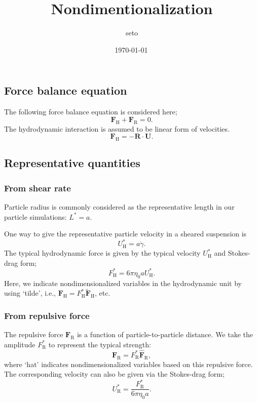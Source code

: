 \documentclass[fontsize=11pt]{scrartcl}
\title{Nondimentionalization}
\date{\shortdate\today \, \ampmtime }
\author{seto}
\begin{document}
\maketitle

\subsection*{Force balance equation}

The following force balance equation is considered here;
\begin{equation}
 \bm{F}_{\mathrm{H}} +  \bm{F}_{\mathrm{R}}  = 0.
\end{equation}
%
The hydrodynamic interaction is
assumed to be linear form of velocities.
%
\begin{equation}
 \bm{F}_{\mathrm{H}} = - \bm{R}\cdot\bm{U}.
\end{equation}

\subsection*{Representative quantities}

\subsubsection*{From shear rate}
Particle radius is commonly considered
as the representative length in
our particle simulations: $L^{\ast} = a$.

One way to give the representative particle velocity
in a sheared suspension is
\begin{equation}
U_{\mathrm{H}}^{\ast} = a \dot{\gamma}.
\end{equation}
%
%
The typical hydrodynamic force is given
by the typical velocity $U_{\mathrm{H}}^{\ast} $
and Stokes-drag form;
\begin{equation}
  F_{\mathrm{H}}^{\ast} = 6 \pi \eta_0 a U_{\mathrm{H}}^{\ast}.
\end{equation}
Here, we indicate nondimensionalized variables
in the hydrodynamic unit by using `tilde',
i.e.,
$\bm{F}_{\mathrm{H}} = F_{\mathrm{H}}^{\ast} \tilde{\bm{F}}_{\mathrm{H}} $,
etc.

\subsubsection*{From repulsive force}

The repulsive force $\bm{F}_{\mathrm{R}}$ 
is a function of particle-to-particle distance.
%
We take the amplitude $F_{\mathrm{R}}^{\ast}$
to represent the typical strength:
%
\begin{equation}
 \bm{F}_{\mathrm{R}} =  F_{\mathrm{R}}^{\ast}
\hat{\bm{F}}_{\mathrm{R}},
\end{equation}
where `hat' indicates nondimensionalized variables
based on this repulsive force.
%
The corresponding velocity can also be
given via the Stokes-drag form;
\begin{equation}
 U^{\ast}_{\mathrm{R}}
  = \frac{F_{\mathrm{R}}^{\ast}}{6\pi\eta_0 a}.
\end{equation}
%
\end{document}
